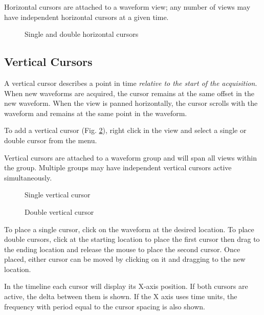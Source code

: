 Horizontal cursors are attached to a waveform view; any number of views may have independent horizontal cursors at a given time.

\begin{figure}[H]
\centering
{}
\caption{Single and double horizontal cursors}
\label{horizontal-cursors}
\end{figure}

\subsection{Vertical Cursors}

A vertical cursor describes a point in time \emph{relative to the start of the acquisition}. When new waveforms are
acquired, the cursor remains at the same offset in the new waveform. When the view is panned horizontally, the cursor
scrolls with the waveform and remains at the same point in the waveform.

To add a vertical cursor (Fig. \ref{vertical-cursor}), right click in the view and select a single or double cursor
from the  menu.

Vertical cursors are attached to a waveform group and will span all views within the group. Multiple groups may have
independent vertical cursors active simultaneously.

\begin{figure}[H]
\centering
{}
\caption{Single vertical cursor}
\label{vertical-cursor}
\end{figure}

\begin{figure}[H]
\centering
{}
\caption{Double vertical cursor}
\label{vertical-cursor-x2}
\end{figure}

To place a single cursor, click on the waveform at the desired location. To place double cursors, click at the starting
location to place the first cursor then drag to the ending location and release the mouse to place the second cursor.
Once placed, either cursor can be moved by clicking on it and dragging to the new location.


In the timeline each cursor will display its X-axis position. If both cursors are active, the delta between them
is shown. If the X axis uses time units, the frequency with period equal to the cursor spacing is also shown.


